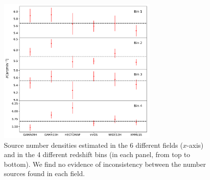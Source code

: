 \documentclass[a4paper,11pt]{article}
\begin{document}
      \begin{figure}
        \centering
        \includegraphics[width=0.7\textwidth]{figures/ndens_consistency.pdf}
        \caption{Source number densities estimated in the 6 different fields ($x$-axis) and in the 4 different redshift bins (in each panel, from top to bottom). We find no evidence of inconsistency between the number sources found in each field.}
        \label{fig:ndens_consistency}
      \end{figure}
\end{document}

